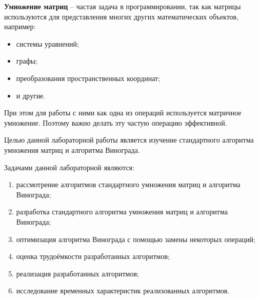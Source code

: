 
\textbf{Умножение матриц} \cite{matrix-mult} – частая задача в программировании, так как матрицы используются для представления многих других математических объектов, например:

\begin{itemize}
	\item системы уравнений;
	\item графы;
	\item преобразования пространственных координат;
	\item и другие.
\end{itemize}

При этом для работы с ними как одна из операций используется матричное умножение. Поэтому важно делать эту частую операцию эффективной. 


Целью данной лабораторной работы является изучение стандартного алгоритма умножения матриц и алгоритма Винограда. 

Задачами данной лабораторной являются:
\begin{enumerate}
	\item рассмотрение алгоритмов стандартного умножения матриц и алгоритма Винограда;
	\item разработка стандартного алгоритма умножения матриц и алгоритма Винограда;
	\item оптимизация алгоритма Винограда с помощью замены некоторых операций;
	\item оценка трудоёмкости разработанных алгоритмов;
	\item реализация разработанных алгоритмов; 
	\item исследование временных характеристик реализованных алгоритмов.
\end{enumerate}
\newpage

\clearpage

